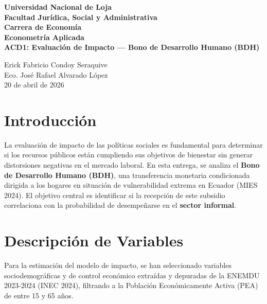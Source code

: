 \documentclass[12pt,spanish]{article}
\begin{document}
\begin{center}
    {\bfseries \Large Universidad Nacional de Loja}\\[0.3cm]
    {\bfseries \large Facultad Jurídica, Social y
Administrativa}\\[0.2cm]
    {\bfseries Carrera de Economía}\\[1.5cm]
    
    {\bfseries \large Econometría Aplicada}\\[1cm]
    
    {\bfseries \Large ACD1: Evaluación de Impacto --- Bono de Desarrollo
Humano (BDH)}\\[1.5cm]
\end{center}

 Erick Fabricio Condoy Seraquive \\
 Eco. José Rafael Alvarado López \\
 20 de abril de 2026 \\

\vspace{1cm}

\doublespacing
\setlength{\parindent}{1.27cm}

\section{Introducción}\label{introducciuxf3n}

La evaluación de impacto de las políticas sociales es fundamental para
determinar si los recursos públicos están cumpliendo sus objetivos de
bienestar sin generar distorsiones negativas en el mercado laboral. En
esta entrega, se analiza el \textbf{Bono de Desarrollo Humano (BDH)},
una transferencia monetaria condicionada dirigida a los hogares en
situación de vulnerabilidad extrema en Ecuador (MIES 2024). El objetivo
central es identificar si la recepción de este subsidio correlaciona con
la probabilidad de desempeñarse en el \textbf{sector informal}.

\section{Descripción de Variables}\label{descripciuxf3n-de-variables}

Para la estimación del modelo de impacto, se han seleccionado variables
sociodemográficas y de control económico extraídas y depuradas de la
ENEMDU 2023-2024 (INEC 2024), filtrando a la Población Económicamente
Activa (PEA) de entre 15 y 65 años.
\end{document}
